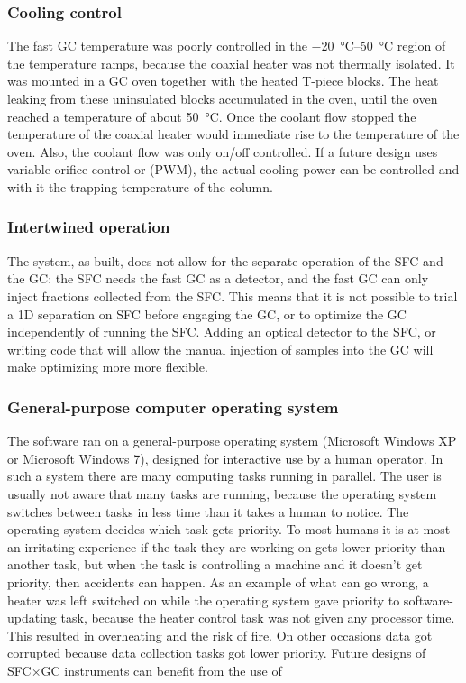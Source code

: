 \subsubsection{Cooling control}

The fast GC temperature was poorly controlled in the \SIrange{-20}{50}{\celsius}
region of the temperature ramps, because the coaxial heater was not thermally
isolated. It was mounted in a GC oven together with the heated T-piece blocks.
The heat leaking from these uninsulated blocks accumulated in the oven, until
the oven reached a temperature of about \SI{50}{\celsius}. Once the coolant flow
stopped the temperature of the coaxial heater would immediate rise to the
temperature of the oven. Also, the coolant flow was only on/off controlled. If a
future design uses variable orifice control or  (PWM), the actual cooling power can be controlled and with it the
trapping temperature of the column.

\subsubsection{Intertwined operation}

The system, as built, does not allow for the separate operation of the SFC and
the GC: the SFC needs the fast GC as a detector, and the fast GC can only inject
fractions collected from the SFC. This means that it is not possible to trial a
1D separation on SFC before engaging the \twoD GC, or to optimize the GC
independently of running the SFC. Adding an optical detector to the SFC, or
writing code that will allow the manual injection of samples into the GC will
make optimizing more more flexible.

\subsubsection{General-purpose computer operating system}

The software ran on a general-purpose operating system (Microsoft Windows XP or
Microsoft Windows 7), designed for interactive use by a human operator. In such
a system there are many computing tasks running in parallel. The user is usually
not aware that many tasks are running, because the operating system switches
between tasks in less time than it takes a human to notice. The operating system
decides which task gets priority. To most humans it is at most an irritating
experience if the task they are working on gets lower priority than another
task, but when the task is controlling a machine and it doesn't get priority,
then accidents can happen. As an example of what can go wrong, a heater was left
switched on while the operating system gave priority to software-updating task,
because the heater control task was not given any processor time. This resulted
in overheating and the risk of fire. On other occasions data got corrupted
because data collection tasks got lower priority. Future designs of SFC×GC
instruments can benefit from the use of 

